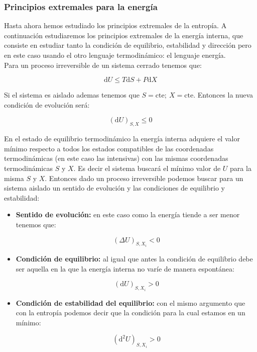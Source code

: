 \documentclass[12pt,a4paper]{article}
\newcommand{\D}{\mathrm{d}}
\newcommand{\cte}{\mathrm{cte}}
\begin{document}
\subsubsection{Principios extremales para la energía}

Hasta ahora hemos estudiado los principios extremales de la entropía. A continuación estudiaremos los principios extremales de la energía interna, que consiste en estudiar tanto la condición de equilibrio, estabilidad y dirección pero en este caso usando el otro lenguaje termodinámico: el lenguaje energía. \\

Para un proceso irreversible de un sistema cerrado tenemos que:

$$ \D U \leq T \D S + P \D X $$

Si el sistema es aislado ademas tenemos que $S = \cte; \ X = \cte$. Entonces la nueva condición de evolución será:

\begin{equation}
(\D U)_{S,X} \leq 0
\end{equation}

En el estado de equilibrio termodinámico la energía interna adquiere el valor mínimo respecto a todos los estados compatibles de las coordenadas termodinámicas (en este caso las intensivas) con las mismas coordenadas termodinámicas $S$ y $X$. Es decir el sistema buscará el mínimo valor de $U$ para la misma $S$ y $X$. Entonces dado un proceso irreversible podemos buscar para un sistema aislado un sentido de evolución y las condiciones de equilibrio y estabilidad:

\begin{itemize}
\item \textbf{Sentido de evolución:} en este caso como la energía tiende a ser menor tenemos que:

\begin{equation}
(\Delta U)_{S,X_i} < 0 
\end{equation}

\item \textbf{Condición de equilibrio:} al igual que antes la condición de equilibrio debe ser aquella en la que la energía interna no varíe de manera espontánea:

\begin{equation}
(\D U)_{S,X_i} > 0
\end{equation}

\item \textbf{Condición de estabilidad del equilibrio:} con el mismo argumento que con la entropía podemos decir que la condición para la cual estamos en un mínimo:

\begin{equation}
(\D^2 U)_{S,X_i} > 0
\end{equation}

\end{itemize}
\end{document}
